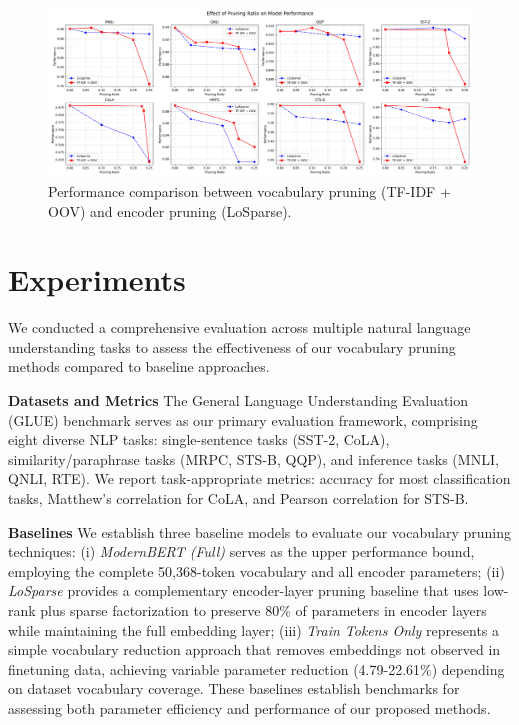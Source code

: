 \documentclass[twocolumn]{article}
\begin{document}
\begin{figure}[t]
    \centering
    \includegraphics[width=\linewidth]{images/pruning_ratios.png}
    \caption{Performance comparison between vocabulary pruning (TF-IDF + OOV) and encoder pruning (LoSparse).}
    \label{fig:pruning_ratio}
\end{figure}

\section{Experiments}
We conducted a comprehensive evaluation across multiple natural language understanding tasks to assess the effectiveness of our vocabulary pruning methods compared to baseline approaches.

\textbf{Datasets and Metrics} 
The General Language Understanding Evaluation (GLUE) benchmark\cite{wang2018glue} serves as our primary evaluation framework, comprising eight diverse NLP tasks: single-sentence tasks (SST-2, CoLA), similarity/paraphrase tasks (MRPC, STS-B, QQP), and inference tasks (MNLI, QNLI, RTE). We report task-appropriate metrics: accuracy for most classification tasks, Matthew's correlation for CoLA, and Pearson correlation for STS-B. 

\textbf{Baselines} 
We establish three baseline models to evaluate our vocabulary pruning techniques: 
(i) \textit{ModernBERT (Full)} serves as the upper performance bound, employing the complete 50,368-token vocabulary and all encoder parameters; 
(ii) \textit{LoSparse} provides a complementary encoder-layer pruning baseline that uses low-rank plus sparse factorization to preserve 80\% of parameters in encoder layers while maintaining the full embedding layer; 
(iii) \textit{Train Tokens Only} represents a simple vocabulary reduction approach that removes embeddings not observed in finetuning data, achieving variable parameter reduction (4.79-22.61\%) depending on dataset vocabulary coverage. 
These baselines establish benchmarks for assessing both parameter efficiency and performance of our proposed methods.
\end{document}
